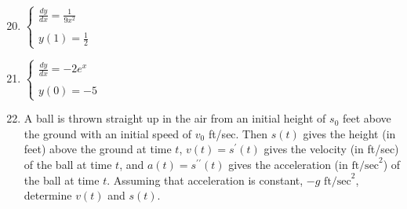 \documentclass[12pt]{article}
\newif\ifans
\begin{document}
\begin{enumerate}
\setcounter{enumi}{19}

\item $\left\{\begin{array}{l}
\frac{dy}{dx}=\frac{1}{9x^2}\\
\\
y(1)=\frac{1}{2}
\end{array}\right.$

\ifans{\fbox{$y=-\frac{1}{9}x^{-1}+\frac{11}{18}$}} \fi

\item $\left\{\begin{array}{l}
\frac{dy}{dx}=-2e^{x}\\
\\
y(0)=-5
\end{array}\right.$

\ifans{\fbox{$y=-2e^{x}-3$}} \fi

\item A ball is thrown straight up in the air from an initial height of $s_0$ feet above the ground with an initial speed of $v_0$ ft/sec.  Then $s(t)$ gives the height (in feet) above the ground at time $t$, $v(t)=s^{\prime}(t)$ gives the velocity (in ft/sec) of the ball at time $t$, and $a(t)=s^{\prime \prime}(t)$ gives the acceleration (in $\text{ft/sec}^2$) of the ball at time $t$.  Assuming that acceleration is constant, $-g \text{ ft/sec}^2$, determine $v(t)$ and $s(t)$.

\ifans{\fbox{$v(t)=-gt+v_0$, $s(t)=-\frac{1}{2}gt^2+v_0t+s_0$}} \fi

\end{enumerate}
\end{document}

